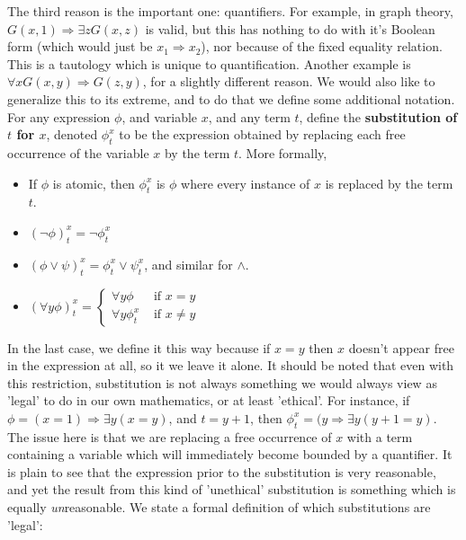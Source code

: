 The third reason is the important one: quantifiers. For example, in graph theory, $G(x,1) \Rightarrow \exists z G(x,z)$ is valid, but this has nothing to do with it's Boolean form (which would just be $x_1 \Rightarrow x_2$), nor because of the fixed equality relation. This is a tautology which is unique to quantification. Another example is $\forall x G(x,y) \Rightarrow G(z,y)$, for a slightly different reason. We would also like to generalize this to its extreme, and to do that we define some additional notation. For any expression $\phi$, and variable $x$, and any term $t$, define the \textbf{substitution of $t$ for $x$}, denoted $\phi_t^x$ to be the expression obtained by replacing each free occurrence of the variable $x$ by the term $t$. More formally,
\begin{itemize}
    \item If $\phi$ is atomic, then $\phi_t^x$ is $\phi$ where every instance of $x$ is replaced by the term $t$.
    \item $(\neg \phi)_t^x = \neg \phi_t^x$
    \item $(\phi \vee \psi)_t^x = \phi_t^x \vee \psi_t^x$, and similar for $\wedge$.
    \item $(\forall y \phi)_t^x = \begin{cases}
                                     \forall y \phi & \textrm{ if $x = y$} \\
                                     \forall y \phi_t^x & \textrm{ if $x \neq y$}
                                  \end{cases}$
\end{itemize}
In the last case, we define it this way because if $x = y$ then $x$ doesn't appear free in the expression at all, so it we leave it alone. It should be noted that even with this restriction, substitution is not always something we would always view as 'legal' to do in our own mathematics, or at least 'ethical'. For instance, if $\phi = (x=1) \Rightarrow \exists y (x=y)$, and $t = y+1$, then $\phi_t^x = (y \Rightarrow \exists y (y+1 = y)$. The issue here is that we are replacing a free occurrence of $x$ with a term containing a variable which will immediately become bounded by a quantifier. It is plain to see that the expression prior to the substitution is very reasonable, and yet the result from this kind of 'unethical' substitution is something which is equally \textit{un}reasonable. We state a formal definition of which substitutions are 'legal':
